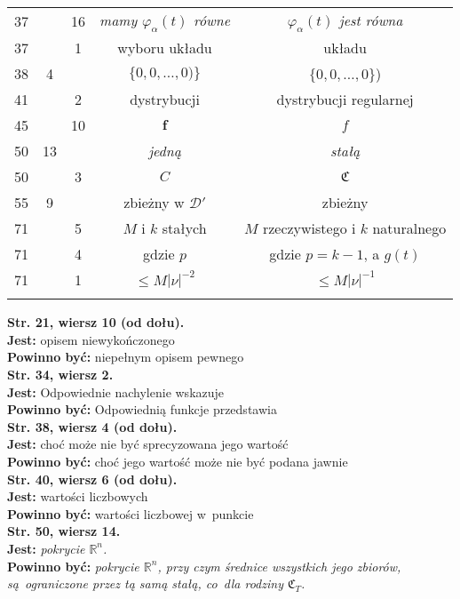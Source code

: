 \documentclass[a4paper,11pt]{article}
\newcommand{\ld}{\ldots}
\newcommand{\mb}{\mathbb}
\newcommand{\mc}{\mathcal}
\newcommand{\mf}{\mathfrak}
\newcommand{\bsym}{\boldsymbol}
\newcommand{\al}{\alpha}
\newcommand{\vp}{\varphi}
\newcommand{\R}{\mb{R}}
\newcommand{\D}{\mc{D}}
\newcommand{\Rn}{\R^{ n }}
\newcommand{\tb}{\textbf}
\newcommand{\noi}{\noindent}
\newcommand{\StrWg}[2]{\tb{Str. #1, wiersz #2.}}
\newcommand{\StrWd}[2]{\tb{Str. #1, wiersz #2 (od dołu).}}
\newcommand{\Jest}{\tb{Jest: }}
\newcommand{\Pow}{\tb{Powinno być: }}
\begin{document}
\begin{center}
\begin{tabular}{|c|c|c|c|c|}
    37 & & 16 & \emph{mamy $\vp_{ \al }( t )$ równe}
           & \emph{$\vp_{ \al }( t )$ jest równa} \\
    37 & & 1 & wyboru układu & układu \\
    38 & 4 & & $\{ 0, 0, \ld, 0 ) \}$ & $\{ 0, 0, \ld, 0 \}$) \\
    41 & & 2 & dystrybucji & dystrybucji regularnej \\
    45 & & 10 & $\bsym{f}$ & $f$ \\
    50 & 13 & & \emph{jedną} & \emph{stałą} \\
    50 & & 3 & $C$ & $\mf{C}$ \\
    55 & 9 & & zbieżny w $\D'$ & zbieżny \\
    71 & & 5 & $M$ i $k$ stałych & $M$ rzeczywistego i $k$ naturalnego \\
    71 & & 4 & gdzie $p$ & gdzie $p = k - 1$, a $g( t )$\\
    71 & & 1 & $\leq M | \nu |^{ -2 }$ & $\leq M | \nu |^{ -1 }$\\
    & & & & \\ \hline
  \end{tabular}
\end{center}
\noi
\StrWd{21}{10} \\
\Jest opisem niewykończonego \\
\Pow niepełnym opisem pewnego \\
\StrWg{34}{2} \\
\Jest Odpowiednie nachylenie wskazuje \\
\Pow Odpowiednią funkcje przedstawia \\
\StrWd{38}{4} \\
\Jest choć może nie być sprecyzowana jego wartość \\
\Pow choć jego wartość może nie być podana jawnie \\
\StrWd{40}{6} \\
\Jest wartości liczbowych \\
\Pow wartości liczbowej w~punkcie \\
\StrWg{50}{14} \\
\Jest \emph{pokrycie $\Rn$.} \\
\Pow \emph{pokrycie $\Rn$, przy czym średnice wszystkich jego zbiorów,
  są~ograniczone przez tą samą stałą, co~dla rodziny $\mf{C}_{ T }$.} \\









 {}
\end{document}
